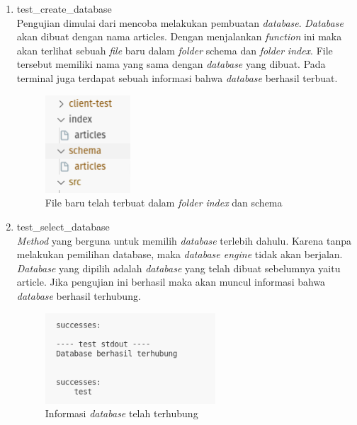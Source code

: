 \begin{enumerate}
	\item test\_create\_database \\
  Pengujian dimulai dari mencoba melakukan pembuatan \emph{database}. \emph{Database} akan dibuat dengan nama articles. Dengan menjalankan \emph{function} ini
  maka akan terlihat sebuah \emph{file} baru dalam \emph{folder} schema dan \emph{folder} \emph{index}. File tersebut memiliki nama yang sama dengan \emph{database} yang dibuat.
  Pada terminal juga terdapat sebuah informasi bahwa \emph{database} berhasil terbuat.
  \begin{figure}[H]
  	\centering{}
	\includegraphics[width=0.3\textwidth]{gambar/bab4/test-create-database}
  	\caption{File baru telah terbuat dalam \emph{folder} \emph{index} dan schema}
  \end{figure}
	
	\item test\_select\_database \\
  \emph{Method} yang berguna untuk memilih \emph{database} terlebih dahulu. Karena tanpa melakukan pemilihan database, maka \emph{database engine} tidak akan berjalan.
  \emph{Database} yang dipilih adalah \emph{database} yang telah dibuat sebelumnya yaitu article. Jika pengujian ini berhasil maka akan muncul informasi bahwa
  \emph{database} berhasil terhubung.
   \begin{figure}[H]
  	\centering{}
	\includegraphics[width=0.6\textwidth]{gambar/bab4/test-select-database}
  	\caption{Informasi \emph{database} telah terhubung}
   \end{figure}


\end{enumerate}
